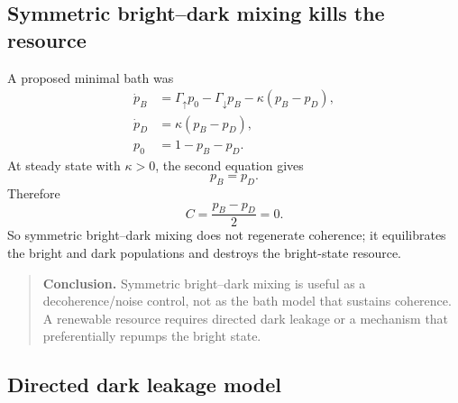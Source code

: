 \documentclass[11pt,a4paper]{article}
\newenvironment{resultbox}{\begin{quote}\small}{\end{quote}}
\begin{document}
\subsection{Symmetric bright--dark mixing kills the resource}

A proposed minimal bath was
\begin{align}
\dot p_B&=\Gamma_\uparrow p_0-\Gamma_\downarrow p_B-\kappa(p_B-p_D),\\
\dot p_D&=\kappa(p_B-p_D),\\
p_0&=1-p_B-p_D.
\end{align}
At steady state with $\kappa>0$, the second equation gives
\begin{equation}
p_B=p_D.
\end{equation}
Therefore
\begin{equation}
C=\frac{p_B-p_D}{2}=0.
\end{equation}
So symmetric bright--dark mixing does not regenerate coherence; it equilibrates the bright and dark populations and destroys the bright-state resource.

\begin{resultbox}
\textbf{Conclusion.} Symmetric bright--dark mixing is useful as a decoherence/noise control, not as the bath model that sustains coherence. A renewable resource requires directed dark leakage or a mechanism that preferentially repumps the bright state.
\end{resultbox}

\subsection{Directed dark leakage model}
\end{document}
